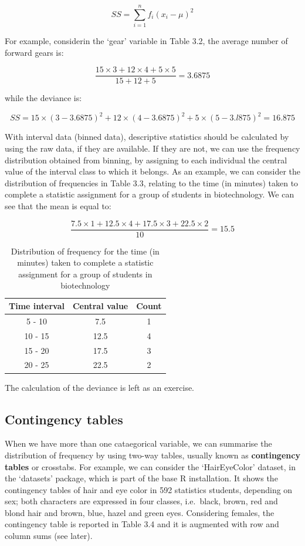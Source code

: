 \documentclass[a4paper,12pt,oneside]{book}
\begin{document}
\[ SS = \sum\limits_{i = 1}^n f_i (x_i - \mu)^2 \]

For example, considerin the `gear' variable in Table 3.2, the average number of forward gears is:

\[\frac{ 15 \times 3 + 12 \times 4 + 5 \times 5}{15 + 12 + 5} = 3.6875\]

while the deviance is:

\[SS = 15 \times (3 - 3.6875)^2 + 12 \times (4 - 3.6875)^2 + 5 \times (5 - 3.l875)^2 = 16.875\]

With interval data (binned data), descriptive statistics should be calculated by using the raw data, if they are available. If they are not, we can use the frequency distribution obtained from binning, by assigning to each individual the central value of the interval class to which it belongs. As an example, we can consider the distribution of frequencies in Table 3.3, relating to the time (in minutes) taken to complete a statistic assignment for a group of students in biotechnology. We can see that the mean is equal to:

\[ \frac{7.5 \times 1 + 12.5 \times 4 + 17.5 \times 3 + 22.5 \times 2}{10} = 15.5\]

\begin{table}

\caption{\label{tab:unnamed-chunk-5}Distribution of frequency for the time (in minutes) taken to complete a statistic assignment for a group of students in biotechnology}
\centering
\begin{tabular}[t]{ccc}
\toprule
Time interval & Central value & Count\\
\midrule
5 - 10 & 7.5 & 1\\
10 - 15 & 12.5 & 4\\
15 - 20 & 17.5 & 3\\
20 - 25 & 22.5 & 2\\
\bottomrule
\end{tabular}
\end{table}

The calculation of the deviance is left as an exercise.

\hypertarget{contingency-tables}{%
\subsection{Contingency tables}\label{contingency-tables}}

When we have more than one cataegorical variable, we can summarise the distribution of frequency by using two-way tables, usually known as \textbf{contingency tables} or crosstabs. For example, we can consider the `HairEyeColor' dataset, in the `datasets' package, which is part of the base R installation. It shows the contingency tables of hair and eye color in 592 statistics students, depending on sex; both characters are expressed in four classes, i.e.~black, brown, red and blond hair and brown, blue, hazel and green eyes. Considering females, the contingency table is reported in Table 3.4 and it is augmented with row and column sums (see later).
\end{document}
